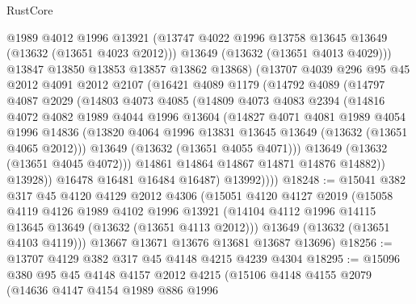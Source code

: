 \begin{lexlean}{RustCore}
\begin{coremodule}
              @1989
              @4012
              @1996
              @13921
              (@13747 @4022 @1996 @13758 @13645 @13649 (@13632 (@13651 @4023 @2012)))
              @13649
              (@13632 (@13651 @4013 @4029)))
            @13847
            @13850
            @13853
            @13857
            @13862
            @13868)
          (@13707
            @4039
            @296
            @95
            @45
            @2012
            @4091
            @2012
            @2107
            (@16421
              @4089
              @1179
              (@14792
                @4089
                (@14797
                  @4087
                  @2029
                  (@14803
                    @4073
                    @4085
                    (@14809
                      @4073
                      @4083
                      @2394
                      (@14816
                        @4072
                        @4082
                        @1989
                        @4044
                        @1996
                        @13604
                        (@14827
                          @4071
                          @4081
                          @1989
                          @4054
                          @1996
                          @14836
                          (@13820 @4064 @1996 @13831 @13645 @13649 (@13632 (@13651 @4065 @2012)))
                          @13649
                          (@13632 (@13651 @4055 @4071)))
                        @13649
                        (@13632 (@13651 @4045 @4072)))
                      @14861
                      @14864
                      @14867
                      @14871
                      @14876
                      @14882))
                  @13928))
              @16478
              @16481
              @16484
              @16487)
            @13992))))
@18248 := @15041
    @382
    @317
    @45
    @4120
    @4129
    @2012
    @4306
    (@15051
      @4120
      @4127
      @2019
      (@15058
        @4119
        @4126
        @1989
        @4102
        @1996
        @13921
        (@14104 @4112 @1996 @14115 @13645 @13649 (@13632 (@13651 @4113 @2012)))
        @13649
        (@13632 (@13651 @4103 @4119)))
      @13667
      @13671
      @13676
      @13681
      @13687
      @13696)
@18256 := @13707 @4129 @382 @317 @45 @4148 @4215 @4239 @4304
@18295 := @15096
    @380
    @95
    @45
    @4148
    @4157
    @2012
    @4215
    (@15106
      @4148
      @4155
      @2079
      (@14636
        @4147
        @4154
        @1989
        @886
        @1996

\end{coremodule}
\end{lexlean}
